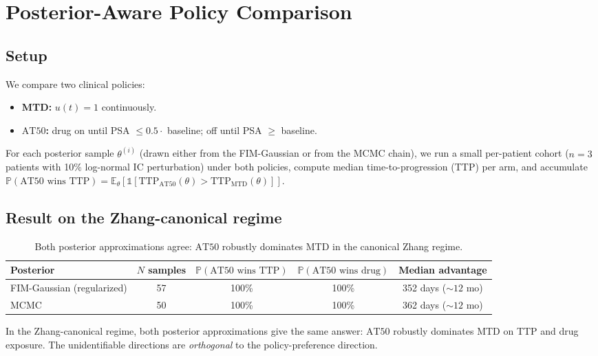 \documentclass[11pt]{article}
\newcommand{\E}{\mathbb{E}}
\newcommand{\Prob}{\mathbb{P}}
\newcommand{\TTP}{\mathrm{TTP}}
\newcommand{\AT}{\mathrm{AT}}
\newcommand{\MTD}{\mathrm{MTD}}
\begin{document}
\section{Posterior-Aware Policy Comparison}\label{sec:policy}

\subsection{Setup}

We compare two clinical policies:
\begin{itemize}
\item \textbf{MTD:} $u(t) = 1$ continuously.
\item \textbf{$\AT 50$:} drug on until PSA $\le 0.5 \cdot$ baseline; off until PSA $\ge$ baseline.
\end{itemize}

For each posterior sample $\theta^{(i)}$ (drawn either from the FIM-Gaussian or
from the MCMC chain), we run a small per-patient cohort ($n=3$ patients with
10\% log-normal IC perturbation) under both policies, compute median
time-to-progression (TTP) per arm, and accumulate
$\Prob(\AT 50 \text{ wins } \TTP) = \E_\theta[\mathbb{1}[\TTP_{\AT 50}(\theta) > \TTP_{\MTD}(\theta)]]$.

\subsection{Result on the Zhang-canonical regime}

\begin{table}[h]
\centering
\begin{tabular}{lcccc}
\toprule
Posterior & $N$ samples & $\Prob(\AT 50 \text{ wins } \TTP)$ & $\Prob(\AT 50 \text{ wins drug})$ & Median advantage \\
\midrule
FIM-Gaussian (regularized) & 57 & 100\% & 100\% & 352 days ($\sim 12$ mo) \\
MCMC & 50 & 100\% & 100\% & 362 days ($\sim 12$ mo) \\
\bottomrule
\end{tabular}
\caption{Both posterior approximations agree: $\AT 50$ robustly dominates MTD
in the canonical Zhang regime.}
\end{table}

In the Zhang-canonical regime, both posterior approximations give the same
answer: $\AT 50$ robustly dominates MTD on TTP and drug exposure. The
unidentifiable directions are \emph{orthogonal} to the policy-preference
direction.
\end{document}
